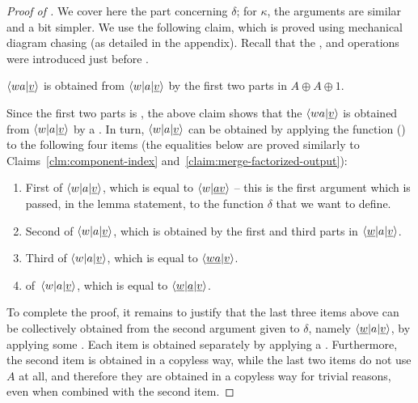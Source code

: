 \begin{proof}[Proof of ]
  We cover here the part concerning $\delta$; for $\kappa$, the arguments are
  similar and a bit simpler. We use the following claim, which is proved using
  mechanical diagram chasing (as detailed in the appendix). Recall that
  the ,  and  operations were introduced just before
  .
    \begin{claim}\label{claim:merge-factorized-output}
        $\langle wa|\underline v \rangle$ is obtained from $\langle w|a|\underline v \rangle$ by  the first two parts in $A \oplus A \oplus 1$.
    \end{claim}

    Since  the first two parts is ,  the above
    claim shows that the  $\langle wa|\underline v \rangle$ is
    obtained from $\langle w|a|\underline v \rangle$ by a .
    In turn, $\langle w|a|\underline v \rangle$ can be obtained by applying the  function () to the following four items (the equalities below are proved similarly to Claims~\ref{clm:component-index} and~\ref{claim:merge-factorized-output}):
     \begin{enumerate}
        \item \label{it:first-view}First  of $\langle w|a|\underline v \rangle$, which is equal to $\langle w|\underline {av} \rangle$ -- this is the first argument which is passed, in the lemma statement, to the function $\delta$ that we want to define.
        \item  \label{it:second-view} Second  of $\langle w|a|\underline v \rangle$, which is obtained by  the first and third parts in $\langle \underline w|a|\underline v \rangle$.
        \item \label{it:third-view}   Third  of $\langle w|a|\underline v \rangle$, which is equal to $\langle \underline {wa}|\underline{v} \rangle$.
        \item   \label{it:shape}  of~$\langle w|a|\underline v \rangle$, which is equal to $\langle \underline w|\underline a| \underline v \rangle$.
     \end{enumerate}

To complete the proof, it remains to justify that the last three items above can
be collectively obtained from the second argument given to $\delta$, namely $\langle \underline w|a|\underline v \rangle$, by applying some . Each item is obtained separately by applying a . Furthermore, the second item is obtained in a copyless way, while the last two items do not use $A$ at all, and therefore they are obtained in a copyless way for trivial reasons, even when combined with the second item.
\end{proof}



